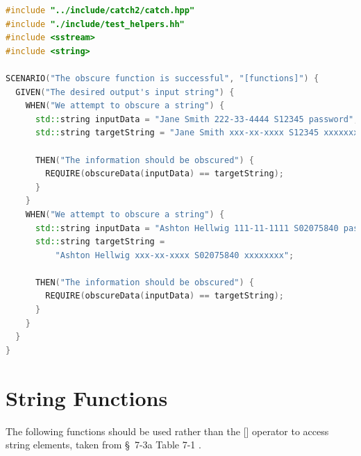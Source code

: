 \documentclass[a4paper, 11pt]{article}
\theoremstyle{definition}
\theoremstyle{plain}
\begin{document}
      \begin{lstlisting}[language=c++,caption={TestCase.cxx}]
#include "../include/catch2/catch.hpp"
#include "./include/test_helpers.hh"
#include <sstream>
#include <string>

SCENARIO("The obscure function is successful", "[functions]") {
  GIVEN("The desired output's input string") {
    WHEN("We attempt to obscure a string") {
      std::string inputData = "Jane Smith 222-33-4444 S12345 password";
      std::string targetString = "Jane Smith xxx-xx-xxxx S12345 xxxxxxxx";

      THEN("The information should be obscured") {
        REQUIRE(obscureData(inputData) == targetString);
      }
    }
    WHEN("We attempt to obscure a string") {
      std::string inputData = "Ashton Hellwig 111-11-1111 S02075840 password";
      std::string targetString =
          "Ashton Hellwig xxx-xx-xxxx S02075840 xxxxxxxx";

      THEN("The information should be obscured") {
        REQUIRE(obscureData(inputData) == targetString);
      }
    }
  }
}
      \end{lstlisting}

    \newpage
    \section{String Functions}\label{app:stringfuncs}
      The following functions should be used rather than the [] operator
        to access string elements, taken from \S~7-3a Table 7-1
        \parencite[\S~7-3a]{textbook}.
\end{document}
